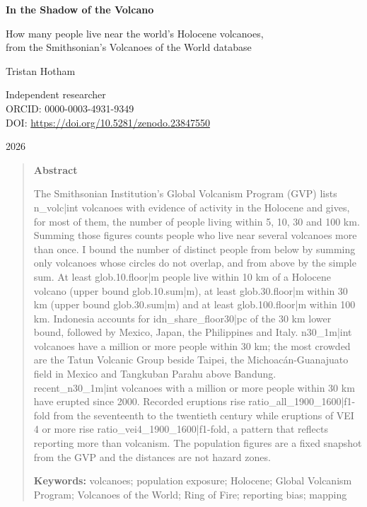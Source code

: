 \documentclass[11pt,a4paper]{article}
\begin{document}
\begin{center}
{\Large\bfseries In the Shadow of the Volcano\par}
\vspace{0.4em}
{\large How many people live near the world's Holocene volcanoes,\\from the Smithsonian's Volcanoes of the World database\par}
\vspace{1.2em}
{\large Tristan Hotham\par}
\vspace{0.3em}
{\small Independent researcher\\
ORCID: 0000-0003-4931-9349\\
DOI: \href{https://doi.org/10.5281/zenodo.23847550}{https://doi.org/10.5281/zenodo.23847550}\par}
\vspace{0.8em}
2026
\end{center}

\begin{quote}
\small
\begin{center}\textbf{Abstract}\end{center}
The Smithsonian Institution's Global Volcanism Program (GVP) lists {{n_volc|int}} volcanoes with evidence of activity in the Holocene and gives, for most of them, the number of people living within 5, 10, 30 and 100 km. Summing those figures counts people who live near several volcanoes more than once. I bound the number of distinct people from below by summing only volcanoes whose circles do not overlap, and from above by the simple sum. At least {{glob.10.floor|m}} people live within 10 km of a Holocene volcano (upper bound {{glob.10.sum|m}}), at least {{glob.30.floor|m}} within 30 km (upper bound {{glob.30.sum|m}}) and at least {{glob.100.floor|m}} within 100 km. Indonesia accounts for {{idn_share_floor30|pc}} of the 30 km lower bound, followed by Mexico, Japan, the Philippines and Italy. {{n30_1m|int}} volcanoes have a million or more people within 30 km; the most crowded are the Tatun Volcanic Group beside Taipei, the Michoac\'an-Guanajuato field in Mexico and Tangkuban Parahu above Bandung. {{recent_n30_1m|int}} volcanoes with a million or more people within 30 km have erupted since 2000. Recorded eruptions rise {{ratio_all_1900_1600|f1}}-fold from the seventeenth to the twentieth century while eruptions of VEI 4 or more rise {{ratio_vei4_1900_1600|f1}}-fold, a pattern that reflects reporting more than volcanism. The population figures are a fixed snapshot from the GVP and the distances are not hazard zones.

\textbf{Keywords:} volcanoes; population exposure; Holocene; Global Volcanism Program; Volcanoes of the World; Ring of Fire; reporting bias; mapping
\end{quote}
\end{document}
